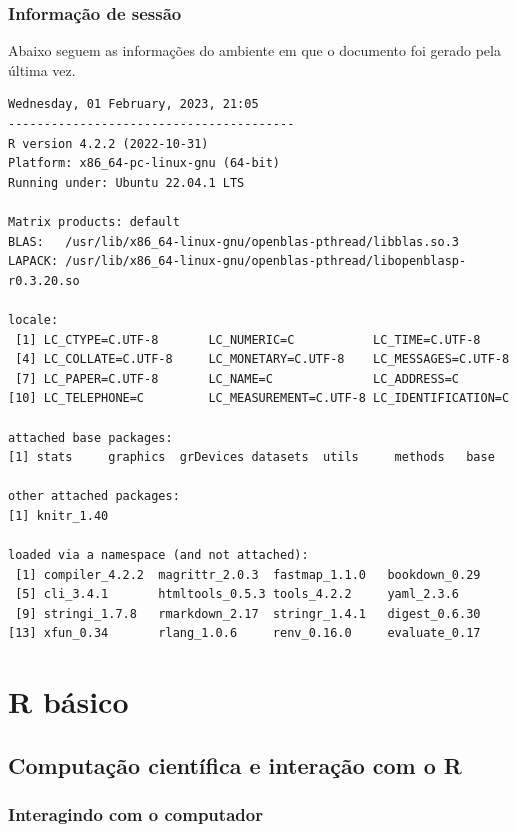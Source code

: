 \documentclass[
  10pt,
  a4paper]{book}
\begin{document}
\hypertarget{informauxe7uxe3o-de-sessuxe3o}{%
\section*{Informação de sessão}\label{informauxe7uxe3o-de-sessuxe3o}}


Abaixo seguem as informações do ambiente em que o documento foi gerado
pela última vez.

\begin{verbatim}
Wednesday, 01 February, 2023, 21:05
----------------------------------------
R version 4.2.2 (2022-10-31)
Platform: x86_64-pc-linux-gnu (64-bit)
Running under: Ubuntu 22.04.1 LTS

Matrix products: default
BLAS:   /usr/lib/x86_64-linux-gnu/openblas-pthread/libblas.so.3
LAPACK: /usr/lib/x86_64-linux-gnu/openblas-pthread/libopenblasp-r0.3.20.so

locale:
 [1] LC_CTYPE=C.UTF-8       LC_NUMERIC=C           LC_TIME=C.UTF-8       
 [4] LC_COLLATE=C.UTF-8     LC_MONETARY=C.UTF-8    LC_MESSAGES=C.UTF-8   
 [7] LC_PAPER=C.UTF-8       LC_NAME=C              LC_ADDRESS=C          
[10] LC_TELEPHONE=C         LC_MEASUREMENT=C.UTF-8 LC_IDENTIFICATION=C   

attached base packages:
[1] stats     graphics  grDevices datasets  utils     methods   base     

other attached packages:
[1] knitr_1.40

loaded via a namespace (and not attached):
 [1] compiler_4.2.2  magrittr_2.0.3  fastmap_1.1.0   bookdown_0.29  
 [5] cli_3.4.1       htmltools_0.5.3 tools_4.2.2     yaml_2.3.6     
 [9] stringi_1.7.8   rmarkdown_2.17  stringr_1.4.1   digest_0.6.30  
[13] xfun_0.34       rlang_1.0.6     renv_0.16.0     evaluate_0.17  
\end{verbatim}

\hypertarget{part-r-buxe1sico}{%
\part{R básico}\label{part-r-buxe1sico}}

\hypertarget{computauxe7uxe3o-cientuxedfica-e-interauxe7uxe3o-com-o-r}{%
\chapter{Computação científica e interação com o R}\label{computauxe7uxe3o-cientuxedfica-e-interauxe7uxe3o-com-o-r}}

\hypertarget{interagindo-com-o-computador}{%
\section{Interagindo com o computador}\label{interagindo-com-o-computador}}
\end{document}
